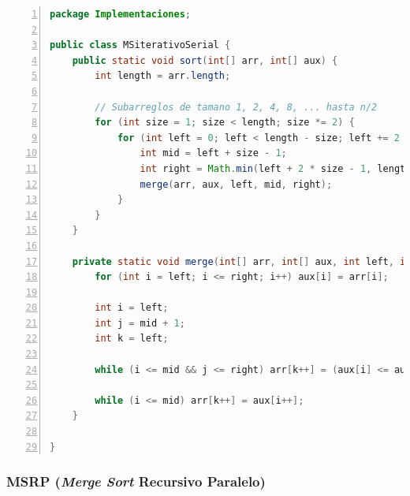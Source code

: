 \documentclass[titlepage]{article}
\begin{document}
	\begin{lstlisting}[language=java, frame=single, numbers=left, float=h]
package Implementaciones;

public class MSiterativoSerial {
	public static void sort(int[] arr, int[] aux) {
		int length = arr.length;
		
		// Subarreglos de tamano 1, 2, 4, 8, ... hasta n/2
		for (int size = 1; size < length; size *= 2) {
			for (int left = 0; left < length - size; left += 2 * size) {
				int mid = left + size - 1;
				int right = Math.min(left + 2 * size - 1, length - 1);
				merge(arr, aux, left, mid, right);
			}
		}
	}
	
	private static void merge(int[] arr, int[] aux, int left, int mid, int right) {
		for (int i = left; i <= right; i++) aux[i] = arr[i];
		
		int i = left;       
		int j = mid + 1;    
		int k = left;       
		
		while (i <= mid && j <= right) arr[k++] = (aux[i] <= aux[j])? aux[i++] : aux[j++];
		
		while (i <= mid) arr[k++] = aux[i++];
	}
	
}
	\end{lstlisting}


\newpage

\subsubsection*{MSRP (\textit{Merge Sort} Recursivo Paralelo)}
\end{document}
